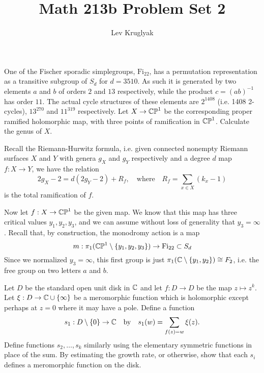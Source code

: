 \documentclass{lkx_pset}
\title{Math 213b Problem Set 2}
\author{Lev Kruglyak}
\begin{document}
\maketitle

\begin{problem}{1}
  One of the Fischer sporadic simplegroups, $\mathrm{Fi}_{22}$, has a permutation representation as a transitive subgroup of $S_d$ for $d=3510$. As such it is generated by two elements $a$ and $b$ of orders $2$ and $13$ respectively, while the product $c=(ab)^{-1}$ has order $11$. The actual cycle structures of these elements are $2^{1408}$ (i.e. 1408 2-cycles), $13^{270}$ and $11^{319}$ respectively. Let $X \to \mathbb{CP}^1$ be the corresponding proper ramified holomorphic map, with three points of ramification in $\mathbb{CP}^1$. Calculate the genus of $X$.
\end{problem}

\begin{solution}
  Recall the Riemann-Hurwitz formula, i.e. given connected nonempty Riemann surfaces $X$ and $Y$ with genera $g_X$ and $g_Y$ respectively and a degree $d$ map $f: X \to Y$, we have the relation
  \[
    2g_X - 2 = d(2g_Y - 2) + R_f,\quad\textrm{where}\quad R_f = \sum_{x\in X} (k_x - 1)
  \]
  is the total ramification of $f$. 

  Now let $f : X \to \mathbb{CP}^1$ be the given map. We know that this map has three critical values $y_1, y_2, y_3$, and we can assume without loss of generality that $y_3=\infty$. Recall that, by construction, the monodromy action is a map 
  \[
    m : \pi_1(\mathbb{CP}^1\setminus \{y_1, y_2, y_3\}) \to \mathrm{Fi}_{22} \subset S_d
  \]
  Since we normalized $y_3=\infty$, this first group is just $\pi_1(\mathbb{C}\setminus \{y_1, y_2\})\cong F_2$, i.e. the free group on two letters $a$ and $b$.

\end{solution}

\begin{problem}{2}
  Let $D$ be the standard open unit disk in $\mathbb{C}$ and let $f : D \to D$ be the map $z \mapsto z^k$. Let $\xi : D \to \mathbb{C}\cup \{\infty\}$ be a meromorphic function which is holomorphic except perhaps at $z=0$ where it may have a pole. Define a function
  \[
    s_1 : D\setminus \{0\} \to \mathbb{C}\quad\textrm{by}\quad s_1(w) = \sum_{f(z)=w} \xi(z).
  \]
  Define functions $s_2, \ldots, s_k$ similarly using the elementary symmetric functions in place of the sum. By estimating the growth rate, or otherwise, show that each $s_i$ defines a meromorphic function on the disk.
\end{problem}
\end{document}
